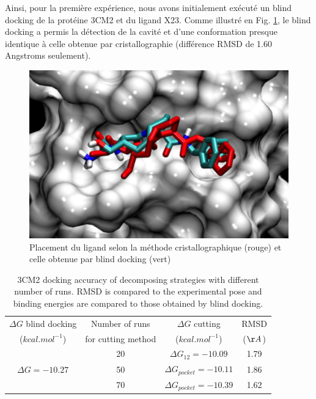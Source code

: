  Ainsi, pour la première expérience, nous avons initialement exécuté un blind docking de la protéine 3CM2 et du ligand X23. Comme illustré en  Fig. \ref{fig:blind}, le blind docking a permis la détection de la cavité et d'une conformation presque identique à celle obtenue par cristallographie (différence RMSD de 1.60 Angstroms seulement).
 
 \begin{figure}[h]
 	\begin{center}
 		\includegraphics[width=1\linewidth]{images/Romain/fig4-color} 
 		\caption{Placement du ligand selon la méthode cristallographique (rouge) et celle obtenue par blind docking (vert)}\label{fig:blind}\vspace{-0.3cm}
 	\end{center}
 \end{figure}
 
 \begin{table}
 	\begin{center}
 		\caption{3CM2 docking accuracy of decomposing strategies with different number of runs. RMSD is compared to the experimental pose and binding energies are compared to those obtained by blind docking.}\label{tab:rmsd}
 		\begin{tabular}{|c|c|c|c|}
 			\hline 
 			$\Delta G$ blind docking & Number of runs  & $\Delta G$ cutting & RMSD  \\ 
 			($kcal.mol^{-1}$)  & for cutting method & ($kcal.mol^{-1}$) &  ($\AA$) \\
 			\hline 
 			\multirow{3}{*}{$\Delta G = -10.27$}  & 20 & $\Delta G_{12} = -10.09$ & 1.79 \\ \cline{2-4}
 			& 50 & $\Delta G_{pocket} = -10.11$ & 1.86 \\ \cline{2-4}
 			& 70 & $\Delta G_{pocket} = -10.39$ & 1.62 \\ \cline{2-4}
 			\hline 
 		\end{tabular} 
 	\end{center}
 	\vspace{-0.3cm}
 \end{table}
 
